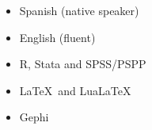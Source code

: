 




\twocolumnsection
{
\begin{itemize}
\vspace{1em}
	\item Spanish (native speaker)
	\item English (fluent)
\end{itemize}}
{
\vspace{1em}
\begin{itemize}
	\item R, Stata and SPSS/PSPP
	\item \LaTeX\ and Lua\LaTeX\
    \item Gephi
\end{itemize}
}
\\